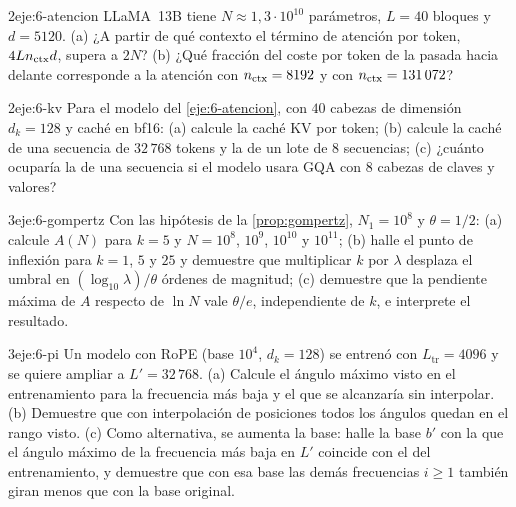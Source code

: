 \begin{ejercicio}{2}{eje:6-atencion}
LLaMA~13B tiene $N\approx 1{,}3\cdot 10^{10}$ parámetros, $L=40$ bloques y $d=5120$. (a) ¿A partir de qué contexto el término de atención por token, $4Ln_{\mathrm{ctx}} d$, supera a $2N$? (b) ¿Qué fracción del coste por token de la pasada hacia delante corresponde a la atención con $n_{\mathrm{ctx}}=8192$ y con $n_{\mathrm{ctx}}=131\,072$?
\end{ejercicio}

\begin{ejercicio}{2}{eje:6-kv}
Para el modelo del \cref{eje:6-atencion}, con $40$ cabezas de dimensión $d_k=128$ y caché en bf16: (a) calcule la caché KV por token; (b) calcule la caché de una secuencia de $32\,768$ tokens y la de un lote de $8$ secuencias; (c) ¿cuánto ocuparía la de una secuencia si el modelo usara GQA con $8$ cabezas de claves y valores?
\end{ejercicio}

\begin{ejercicio}{3}{eje:6-gompertz}
Con las hipótesis de la \cref{prop:gompertz}, $N_1=10^{8}$ y $\theta=1/2$: (a) calcule $A(N)$ para $k=5$ y $N=10^{8}$, $10^{9}$, $10^{10}$ y $10^{11}$; (b) halle el punto de inflexión para $k=1$, $5$ y $25$ y demuestre que multiplicar $k$ por $\lambda$ desplaza el umbral en $(\log_{10}\lambda)/\theta$ órdenes de magnitud; (c) demuestre que la pendiente máxima de $A$ respecto de $\ln N$ vale $\theta/e$, independiente de $k$, e interprete el resultado.
\end{ejercicio}

\begin{ejercicio}{3}{eje:6-pi}
Un modelo con RoPE (base $10^{4}$, $d_k=128$) se entrenó con $L_{\mathrm{tr}}=4096$ y se quiere ampliar a $L'=32\,768$. (a) Calcule el ángulo máximo visto en el entrenamiento para la frecuencia más baja y el que se alcanzaría sin interpolar. (b) Demuestre que con interpolación de posiciones todos los ángulos quedan en el rango visto. (c) Como alternativa, se aumenta la base: halle la base $b'$ con la que el ángulo máximo de la frecuencia más baja en $L'$ coincide con el del entrenamiento, y demuestre que con esa base las demás frecuencias $i\ge 1$ también giran menos que con la base original.
\end{ejercicio}
